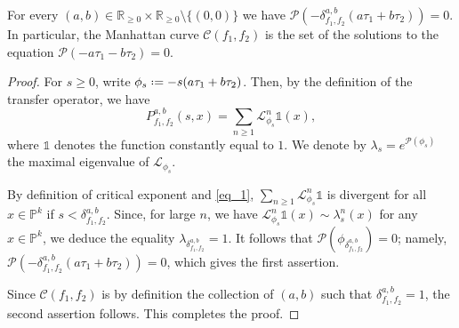 \documentclass[10pt,a4paper]{amsart}
\newcommand*{\defeq}{\mathrel{\vcenter{\baselineskip0.5ex \lineskiplimit0pt
			\hbox{\scriptsize.}\hbox{\scriptsize.}}}%
	=}
\begin{document}
\begin{thm}\label{thm_Bowen}
For every
$(a,b)\in\mathbb{R}_{\ge 0} \times \mathbb{R}_{\ge 0} \setminus \{(0,0)\}$
we have
$\mathcal{P}(-\delta^{a,b}_{f_1,f_2}(a\tau_1 +b\tau_2))=0$. In particular, the Manhattan curve $\mathcal{C}(f_1,f_2)$ is the set of the solutions to the equation
$\mathcal{P}(-a\tau_1-b\tau_2)=0$.
\end{thm}

\begin{proof}
For $s \ge 0$, write $\phi_s \defeq -s(a\tau_1+b\tau_2)$.
Then,
by the definition of
the transfer operator,
we have
\begin{equation}\label{eq_1}
P_{f_1,f_2}^{a,b}(s,x) = \sum_{n\ge 1} \mathcal{L}^n_{\phi_s}\mathds{1}(x),
\end{equation}
where $\mathds{1}$ denotes the function constantly equal to $1$.
We denote by $\lambda_s=e^{\mathcal{P}(\phi_s)}$ the maximal
eigenvalue of $\mathcal{L}_{\phi_s}$.

By definition of critical exponent and \eqref{eq_1}, 
$\sum_{n\ge 1} \mathcal{L}^n_{\phi_s}\mathds{1}$ 
is divergent for all $x \in \mathbb{P}^k$ if $s < \delta_{f_1,f_2}^{a,b}$. Since,
for large $n$,  we have
$\mathcal{L}^n_{\phi_s}\mathds{1}(x) \sim \lambda_s^n(x)$ for any $x\in \mathbb{P}^k$, we 
deduce the equality
$\lambda_{\delta_{f_1,f_2}^{a,b}} = 1$. 
It follows that $\mathcal{P}(\phi_{\delta_{f_1,f_2}^{a,b}}) = 0$; namely, $\mathcal{P}(-\delta_{f_1,f_2}^{a,b}(a\tau_1+b\tau_2)) = 0$, which gives the first assertion. 

Since $\mathcal{C}(f_1,f_2)$ is by definition the collection of $(a,b)$ such that $\delta_{f_1,f_2}^{a,b}=1$, the second assertion follows.
This completes the proof.
\end{proof}
\end{document}
